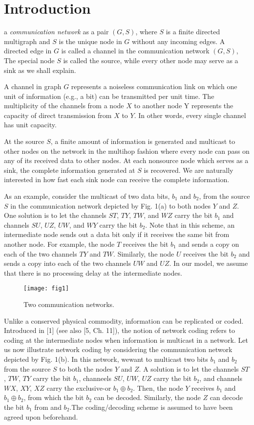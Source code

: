 \documentclass{IEEEtran}
\begin{document}
\section{Introduction}\label{sec:introduction}
 a \emph{communication network} as a pair $(G,S)$, where $S$ is a finite directed multigraph and $S$ is the unique node in $G$ without any incoming edges. A directed edge in $G$ is called a channel in the communication network $(G,S)$, The special node $S$ is called the source, while every other node may serve as a sink as we shall explain.
\par
A channel in graph $G$ represents a noiseless communication link on which one unit of information (e.g., a bit) can be transmitted per unit time. The multiplicity of the channels from a node $X$ to another node Y represents the capacity of direct transmission from $X$ to $Y$. In other words, every single channel has unit capacity.
\par
At the source $S$, a finite amount of information is generated and multicast to other nodes on the network in the multihop fashion where every node can pass on any of its received data to other nodes. At each nonsource node which serves as a sink, the complete information generated at $S$ is recovered. We are naturally interested in how fast each sink node can receive the complete information.
\par
As an example, consider the multicast of two data bits, $b_1$ and $b_2$, from the source $S$ in the communication network depicted by Fig. 1(a) to both nodes $Y$ and $Z$. One solution is to let the channels $ST$, $TY$, $TW$, and $WZ$ carry the bit $b_1$ and channels $SU$, $UZ$, $UW$, and $WY$ carry the bit $b_2$. Note that in this scheme, an intermediate node sends out a data bit only if it receives the same bit from another node. For example, the node $T$ receives the bit $b_1$ and sends a copy on each of the two channels $TY$ and $TW$. Similarly, the node $U$ receives the bit $b_2$ and sends a copy into each of the two channels $UW$ and $UZ$. In our model, we assume that there is no processing delay at the intermediate nodes.
\begin{figure}[H]
	\centering
	\texttt{[image: fig1]}
	\caption{Two communication networks.}
	\label{fig1}
\end{figure}
\par
Unlike a conserved physical commodity, information can be replicated or coded. Introduced in [1] (see also [5, Ch. 11]), the notion of network coding refers to coding at the intermediate nodes when information is multicast in a network. Let us now illustrate network coding by considering the communication network depicted by Fig. 1(b). In this network, wewant to multicast two bits $b_1$ and $b_2$ from the source $S$ to both the nodes $Y$ and $Z$. A solution is to let the channels $ST$, $TW$, $TY$ carry the bit $b_1$, channeels $SU$, $UW$, $UZ$ carry the bit $b_2$, and channels $WX$, $XY$, $XZ$ carry the exclusive-or $b_1 \oplus b_2$. Then, the node $Y$ receives $b_1$ and $b_1 \oplus b_2$, from which the bit $b_2$ can be decoded. Similarly, the node $Z$ can decode the bit $b_1$ from and $b_2$.The coding/decoding scheme is assumed to have been agreed upon beforehand.
\end{document}
